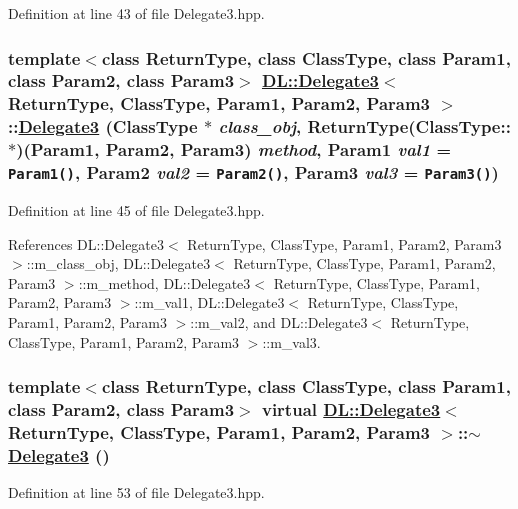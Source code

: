 Definition at line 43 of file Delegate3.hpp.\hypertarget{classDL_1_1Delegate3_a0}{
\subsubsection[Delegate3]{\setlength{\rightskip}{0pt plus 5cm}template$<$class Return\-Type, class Class\-Type, class Param1, class Param2, class Param3$>$ \hyperlink{classDL_1_1Delegate3}{DL::Delegate3}$<$ Return\-Type, Class\-Type, Param1, Param2, Param3 $>$::\hyperlink{classDL_1_1Delegate3}{Delegate3} (Class\-Type $\ast$ {\em class\_\-obj}, Return\-Type(Class\-Type::$\ast$)(Param1, Param2, Param3) {\em method}, Param1 {\em val1} = {\tt Param1()}, Param2 {\em val2} = {\tt Param2()}, Param3 {\em val3} = {\tt Param3()})}}
\label{classDL_1_1Delegate3_a0}




Definition at line 45 of file Delegate3.hpp.

References DL::Delegate3$<$ Return\-Type, Class\-Type, Param1, Param2, Param3 $>$::m\_\-class\_\-obj, DL::Delegate3$<$ Return\-Type, Class\-Type, Param1, Param2, Param3 $>$::m\_\-method, DL::Delegate3$<$ Return\-Type, Class\-Type, Param1, Param2, Param3 $>$::m\_\-val1, DL::Delegate3$<$ Return\-Type, Class\-Type, Param1, Param2, Param3 $>$::m\_\-val2, and DL::Delegate3$<$ Return\-Type, Class\-Type, Param1, Param2, Param3 $>$::m\_\-val3.\hypertarget{classDL_1_1Delegate3_a1}{
\subsubsection[$\sim$Delegate3]{\setlength{\rightskip}{0pt plus 5cm}template$<$class Return\-Type, class Class\-Type, class Param1, class Param2, class Param3$>$ virtual \hyperlink{classDL_1_1Delegate3}{DL::Delegate3}$<$ Return\-Type, Class\-Type, Param1, Param2, Param3 $>$::$\sim$\hyperlink{classDL_1_1Delegate3}{Delegate3} ()}}
\label{classDL_1_1Delegate3_a1}




Definition at line 53 of file Delegate3.hpp.

